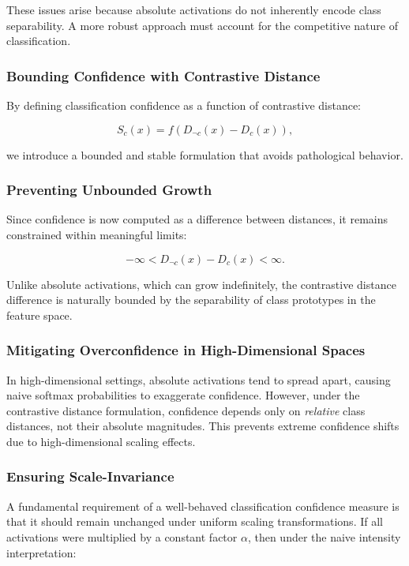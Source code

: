 These issues arise because absolute activations do not inherently encode class separability. A more robust approach must account for the competitive nature of classification.

\subsubsection{Bounding Confidence with Contrastive Distance}

By defining classification confidence as a function of contrastive distance:

\[
S_c(x) = f(D_{\neg c}(x) - D_c(x)),
\]

we introduce a bounded and stable formulation that avoids pathological behavior.

\subsubsection{Preventing Unbounded Growth}

Since confidence is now computed as a difference between distances, it remains constrained within meaningful limits:

\[
-\infty < D_{\neg c}(x) - D_c(x) < \infty.
\]

Unlike absolute activations, which can grow indefinitely, the contrastive distance difference is naturally bounded by the separability of class prototypes in the feature space.

\subsubsection{Mitigating Overconfidence in High-Dimensional Spaces}

In high-dimensional settings, absolute activations tend to spread apart, causing naive softmax probabilities to exaggerate confidence. However, under the contrastive distance formulation, confidence depends only on \textit{relative} class distances, not their absolute magnitudes. This prevents extreme confidence shifts due to high-dimensional scaling effects.

\subsubsection{Ensuring Scale-Invariance}

A fundamental requirement of a well-behaved classification confidence measure is that it should remain unchanged under uniform scaling transformations. If all activations were multiplied by a constant factor \( \alpha \), then under the naive intensity interpretation:

